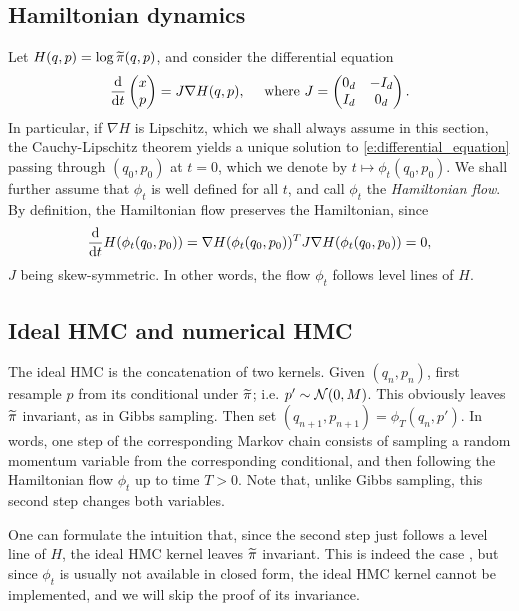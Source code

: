 \subsection{Hamiltonian dynamics}
\label{s:hamiltonian_dynamics}
Let $H(q,p) = \log\widetilde{\pi}(q,p)$, and consider the differential equation 
\begin{equation}
    \label{e:differential_equation}
    \frac{\mathrm{d}}{\mathrm{d} t} \begin{pmatrix} x\\p \end{pmatrix} = J \nabla H(q,p), \quad\text{ where } J=\begin{pmatrix} 0_d & -I_d \\ I_d & 0_d \end{pmatrix}.
\end{equation} 
In particular, if $\nabla H$ is Lipschitz, which we shall always assume in this section, the Cauchy-Lipschitz theorem yields a unique solution to \eqref{e:differential_equation} passing through $(q_0,p_0)$ at $t=0$, which we denote by $t\mapsto \phi_t(q_0,p_0)$.
We shall further assume that $\phi_t$ is well defined for all $t$, and call $\phi_t$ the \emph{Hamiltonian flow}. 
By definition, the Hamiltonian flow preserves the Hamiltonian, since
$$
\frac{\mathrm{d}}{\mathrm{d} t} H(\phi_t(q_0,p_0)) = \nabla H(\phi_t(q_0,p_0))^T J \nabla H(\phi_t(q_0,p_0)) = 0,
$$
$J$ being skew-symmetric.
In other words, the flow $\phi_t$ follows level lines of $H$.

\subsection{Ideal HMC and numerical HMC}
The ideal HMC is the concatenation of two kernels. 
Given $(q_n,p_n)$, first resample $p$ from its conditional under $\widetilde{\pi}$; i.e. $p'\sim \mathcal{N}(0,M)$. 
This obviously leaves $\widetilde{\pi}$ invariant, as in Gibbs sampling. 
Then set $(q_{n+1}, p_{n+1}) = \phi_T(q_n,p')$.
In words, one step of the corresponding Markov chain consists of sampling a random momentum variable from the corresponding conditional, and then following the Hamiltonian flow $\phi_t$ up to time $T>0$.
Note that, unlike Gibbs sampling, this second step changes both variables.

One can formulate the intuition that, since the second step just follows a level line of $H$, the ideal HMC kernel leaves $\widetilde{\pi}$ invariant. This is indeed the case \citep{BoSa18}, but since $\phi_t$ is usually not available in closed form, the ideal HMC kernel cannot be implemented, and we will skip the proof of its invariance. 

